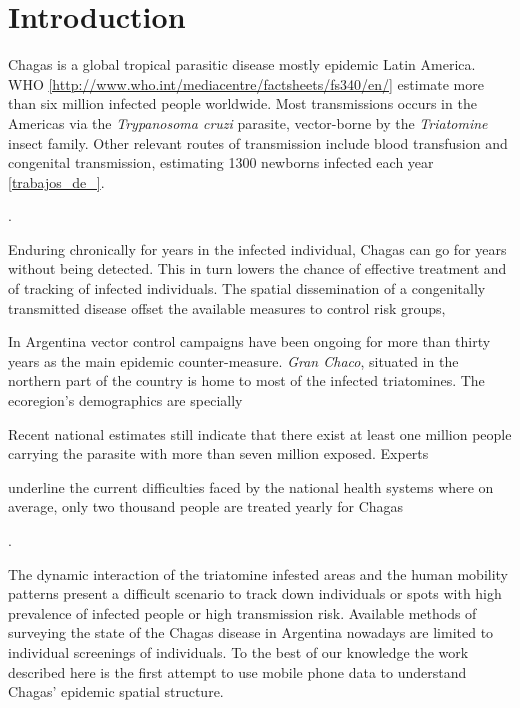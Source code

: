 \section{Introduction}

Chagas is a global tropical parasitic disease mostly epidemic Latin America. WHO \ref{http://www.who.int/mediacentre/factsheets/fs340/en/} estimate more than six million infected people worldwide. Most transmissions occurs in the Americas via the \textit{Trypanosoma cruzi} parasite, vector-borne by the \textit{Triatomine} insect family. Other relevant routes of transmission include blood transfusion and congenital transmission, estimating 1300 newborns infected each year \ref{trabajos_de_}.\begin{comment}  en el drive estan las ppt del min salud \end{comment}. 

Enduring chronically for years in the infected individual, Chagas can go for years without being detected. This in turn lowers the chance of effective treatment and of tracking of infected individuals. The spatial dissemination of a congenitally transmitted disease offset the available measures to control risk groups, 

In Argentina vector control campaigns have been ongoing for more than thirty years as the main epidemic counter-measure. \textit{Gran Chaco}, situated in the northern part of the country is home to most of the infected triatomines. The ecoregion's demographics are specially 

Recent national estimates still indicate that there exist at least one million people carrying the parasite with more than seven million exposed. Experts \begin{comment}  aca como referencio a Diego Weinberg y Mundo Sano? \end{comment} underline the current difficulties faced by the national health systems where on average, only two thousand people are treated yearly for Chagas  \begin{comment}  aca nuevamente esta referencia es de MS \end{comment}. 

The dynamic interaction of the triatomine infested areas and the human mobility patterns present a difficult scenario to track down individuals or spots with high prevalence of infected people or high transmission risk. Available methods of surveying the state of the Chagas disease in Argentina nowadays are limited to individual screenings of individuals. To the best of our knowledge the work described here is the first attempt to use mobile phone data to understand Chagas' epidemic spatial structure. \begin{comment}  Existe una forma de decir esto de manera correcta.. o asi les parece bien? \end{comment}

